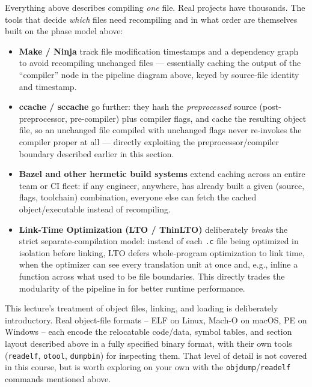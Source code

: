 \documentclass[full-course-notes.tex]{subfiles}
\begin{document}
\begin{enrichment}
Everything above describes compiling \emph{one} file. Real projects have thousands. The tools
that decide \emph{which} files need recompiling and in what order are themselves built on the
phase model above:
\begin{itemize}
  \item \textbf{Make / Ninja} track file modification timestamps and a dependency graph to
  avoid recompiling unchanged files --- essentially caching the output of the ``compiler'' node
  in the pipeline diagram above, keyed by source-file identity and timestamp.
  \item \textbf{ccache / sccache} go further: they hash the \emph{preprocessed} source
  (post-preprocessor, pre-compiler) plus compiler flags, and cache the resulting object file, so
  an unchanged file compiled with unchanged flags never re-invokes the compiler proper at all ---
  directly exploiting the preprocessor/compiler boundary described earlier in this section.
  \item \textbf{Bazel and other hermetic build systems} extend caching across an entire team or
  CI fleet: if any engineer, anywhere, has already built a given (source, flags, toolchain)
  combination, everyone else can fetch the cached object/executable instead of recompiling.
  \item \textbf{Link-Time Optimization (LTO / ThinLTO)} deliberately \emph{breaks} the strict
  separate-compilation model: instead of each \texttt{.c} file being optimized in isolation
  before linking, LTO defers whole-program optimization to link time, when the optimizer can see
  every translation unit at once and, e.g., inline a function across what used to be file
  boundaries. This directly trades the modularity of the pipeline in  for
  better runtime performance.
\end{itemize}
\end{enrichment}

\begin{enrichment}
This lecture's treatment of object files, linking, and loading is deliberately introductory.
Real object-file formats -- ELF on Linux, Mach-O on macOS, PE on Windows -- each encode the
relocatable code/data, symbol tables, and section layout described above in a fully specified
binary format, with their own tools (\texttt{readelf}, \texttt{otool}, \texttt{dumpbin}) for
inspecting them. That level of detail is not covered in this course, but is worth exploring on
your own with the \texttt{objdump}/\texttt{readelf} commands mentioned above.
\end{enrichment}
\end{document}
